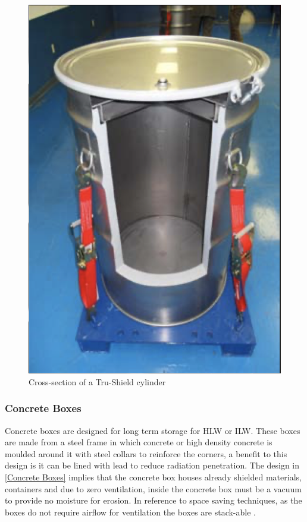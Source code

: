 \begin{figure}[H]
\centering
\includegraphics[scale=0.4]{Media/NuclearResearch/Screenshot 2021-03-15 at 03.18.28.png}
\caption{Cross-section of a Tru-Shield cylinder \cite{Tru-Shield}}
\label{Tru-Shield Image}
\end{figure}

\newpage
\subsubsection*{Concrete Boxes}
\label{Concrete Boxes SubSubSection}

Concrete boxes are designed for long term storage for HLW or ILW. These boxes are made from a steel frame in which concrete or high density concrete is moulded around it with steel collars to reinforce the corners, a benefit to this design is it can be lined with lead to reduce radiation penetration. The design in \cref{Concrete Boxes} implies that the concrete box houses already shielded materials, containers and due to zero ventilation, inside the concrete box must be a vacuum to provide no moisture for erosion. In reference to space saving techniques, as the boxes do not require airflow for ventilation the boxes are stack-able \cite{ConcreteBoxes}. \\

